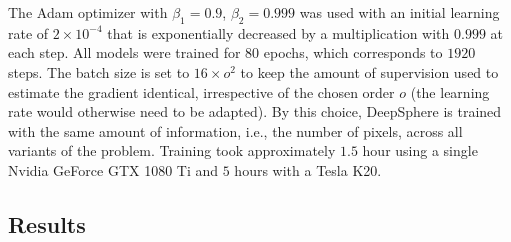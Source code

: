 \documentclass[final,twocolumn,3p,times,sort&compress]{elsarticle}
\newcommand{\1}{\b{1}}              %
\newcommand{\0}{\b{0}}              %
\begin{document}
The Adam optimizer \citep{kingma2014adam} with $\beta_1=0.9$, $\beta_2=0.999$ was used with an initial learning rate of $2 \times 10^{-4}$ that is exponentially decreased by a multiplication with $0.999$ at each step.
All models were trained for $80$ epochs, which corresponds to $1920$ steps. The batch size is set to $16 \times  o^2$ to keep the amount of supervision used to estimate the gradient identical, irrespective of the chosen order $o$ (the learning rate would otherwise need to be adapted). By this choice, DeepSphere is trained with the same amount of information, i.e., the number of pixels, across all variants of the problem.
Training took approximately $1.5$ hour using a single Nvidia GeForce GTX 1080 Ti and $5$ hours with a Tesla K20.

\subsection{Results}
\end{document}
